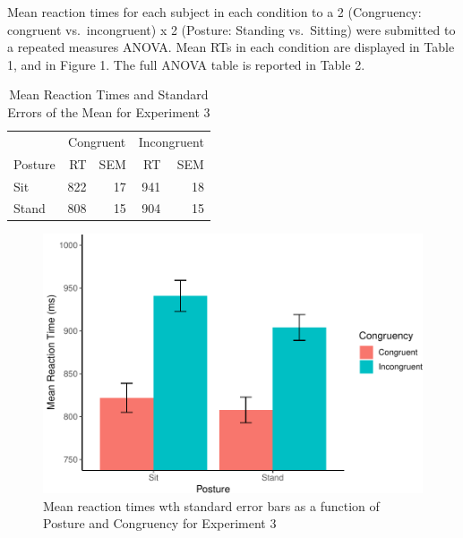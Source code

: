 \documentclass[man]{apa6}
\begin{document}
Mean reaction times for each subject in each condition to a 2 (Congruency: congruent vs.~incongruent) x 2 (Posture: Standing vs.~Sitting) were submitted to a repeated measures ANOVA. Mean RTs in each condition are displayed in Table 1, and in Figure 1. The full ANOVA table is reported in Table 2.

\begin{table}

\caption{\label{tab:unnamed-chunk-2}Mean Reaction Times and Standard Errors of the Mean for Experiment 3}
\centering
\begin{tabular}[t]{lrrrr}
\toprule
\multicolumn{1}{c}{ } & \multicolumn{2}{c}{Congruent} & \multicolumn{2}{c}{Incongruent} \\
\cmidrule(l{2pt}r{2pt}){2-3} \cmidrule(l{2pt}r{2pt}){4-5}
Posture & RT & SEM & RT & SEM\\
\midrule
Sit & 822 & 17 & 941 & 18\\
Stand & 808 & 15 & 904 & 15\\
\bottomrule
\end{tabular}
\end{table}

\begin{figure}
\centering
\includegraphics{APAreport_files/figure-latex/stroopfig-1.pdf}
\caption{\label{fig:stroopfig}Mean reaction times wth standard error bars as a function of Posture and Congruency for Experiment 3}
\end{figure}
\end{document}
